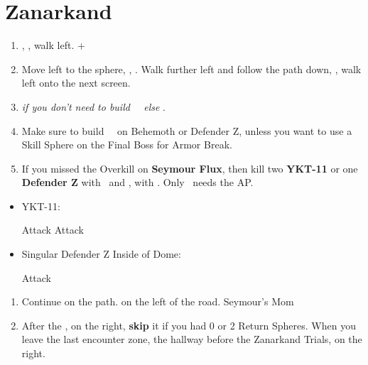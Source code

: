 \chapter{Zanarkand}
\begin{enumerate}
	\item \sd, \cs[0:50], walk left. \fmv+\cs[2:20]
	\item Move left to the sphere, \sd, \cs[1:40]. Walk further left and follow the path down, \cs[3:20], walk left onto the next screen.
	\item \formation{\tidus}{\auron}{\kimahri} \textit{if you don't need to build \rikku\ \od\ else} \formation{\tidus}{\auron}{\rikku}.
	\item Make sure to build \rikku\ \od\ on Behemoth or Defender Z, unless you want to use a Skill Sphere on the Final Boss for Armor Break.
	\item If you missed the Overkill on \textbf{Seymour Flux}, then kill two \textbf{YKT-11} or one \textbf{Defender Z} with \yuna\ and \tidus, with \formation{\tidus}{\yuna}{\auron}. Only \yuna\ needs the AP.
\end{enumerate}
\begin{encounters}
	\begin{itemize}
		\item YKT-11:
		      \begin{itemize}
			      \tidusf Attack
			      \yunaf Attack
		      \end{itemize}
		\item Singular Defender Z Inside of Dome:
		      \begin{itemize}
			      \summon{\bahamut}
			      \bahamutf Attack
		      \end{itemize}
	\end{itemize}
\end{encounters}
\begin{enumerate}[resume]
	\item Continue on the path.  on the left of the road. Seymour's Mom \cs
	\item After the \cs,  on the right, \textbf{skip} it if you had 0 or 2 Return Spheres. When you leave the last encounter zone, the hallway before the Zanarkand Trials,  on the right.
\end{enumerate}
\bothvfill
\bothnp
\winvfill
\winnp
\lossvfill
\lossnp
